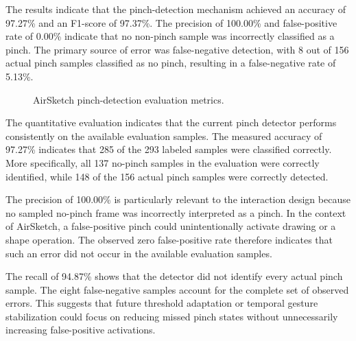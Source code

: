 \documentclass[conference]{IEEEtran}
\begin{document}
The results indicate that the pinch-detection mechanism achieved an
accuracy of 97.27\% and an F1-score of 97.37\%. The precision of
100.00\% and false-positive rate of 0.00\% indicate that no non-pinch
sample was incorrectly classified as a pinch. The primary source of
error was false-negative detection, with 8 out of 156 actual pinch
samples classified as no pinch, resulting in a false-negative rate of
5.13\%.

\begin{figure}[H]
\centering
{}
\caption{AirSketch pinch-detection evaluation metrics.}
\label{fig:metrics}
\end{figure}

The quantitative evaluation indicates that the current pinch detector performs consistently on the available evaluation samples. The measured accuracy of 97.27\% indicates that 285 of the 293 labeled samples were classified correctly. More specifically, all 137 no-pinch samples in the evaluation were correctly identified, while 148 of the 156 actual pinch samples were correctly detected.

The precision of 100.00\% is particularly relevant to the interaction design because no sampled no-pinch frame was incorrectly interpreted as a pinch. In the context of AirSketch, a false-positive pinch could unintentionally activate drawing or a shape operation. The observed zero false-positive rate therefore indicates that such an error did not occur in the available evaluation samples.

The recall of 94.87\% shows that the detector did not identify every actual pinch sample. The eight false-negative samples account for the complete set of observed errors. This suggests that future threshold adaptation or temporal gesture stabilization could focus on reducing missed pinch states without unnecessarily increasing false-positive activations.
\end{document}
